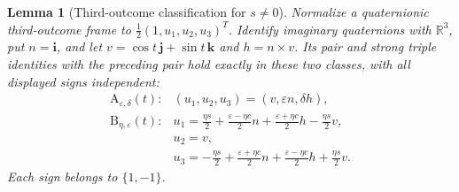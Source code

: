 \documentclass[11pt]{article}
\newtheorem{lemma}[theorem]{Lemma}
\begin{document}
\begin{lemma}[Third-outcome classification for $s\ne0$]
\label{lem:commutingoutcomes}
Normalize a quaternionic third-outcome frame to
$\frac12(1,u_1,u_2,u_3)^T$. Identify imaginary quaternions with
$\mathbb R^3$, put $n=\mathbf i$, and let
$v=\cos t\,\mathbf j+\sin t\,\mathbf k$ and $h=n\times v$.
Its pair and strong triple identities with the preceding pair hold
exactly in these two classes, with all displayed signs independent:
\[
\begin{array}{ll}
\mathrm A_{\varepsilon,\delta}(t):&
 (u_1,u_2,u_3)=(v,\varepsilon n,\delta h),\\[2pt]
\mathrm B_{\eta,\varepsilon}(t):&
 u_1=\frac{\eta s}{2}+\frac{\varepsilon-\eta c}{2}n
       +\frac{\varepsilon+\eta c}{2}h-\frac{\eta s}{2}v,\\
&u_2=v,\\
&u_3=-\frac{\eta s}{2}+\frac{\varepsilon+\eta c}{2}n
       +\frac{\varepsilon-\eta c}{2}h+\frac{\eta s}{2}v.
\end{array}
\]
Each sign belongs to $\{1,-1\}$.
\end{lemma}
\end{document}
